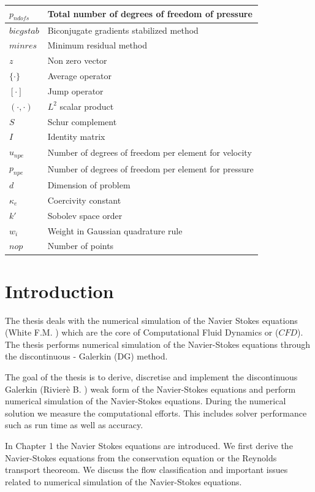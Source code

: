 \documentclass[a4paper,twoside,openright]{book}
\begin{document}
\begin{longtable}{| p{} | p{} |}
$p_{ndofs}$ & Total number of degrees of freedom of pressure\\
\hline
$bicgstab$ & Biconjugate gradients stabilized method\\
\hline
$minres$ & Minimum residual method\\
\hline
$z$ & Non zero vector\\
\hline
$\lbrace \cdot \rbrace$ & Average operator\\
\hline
$[\cdot]$ & Jump operator\\
\hline
$(\cdot,\cdot)$ & $L^2$ scalar product\\
\hline
$S$ & Schur complement\\
\hline
$I$ & Identity matrix\\
\hline
$u_{npe}$ & Number of degrees of freedom per element for velocity\\
\hline
$p_{npe}$ & Number of degrees of freedom per element for pressure\\
\hline
$d$ & Dimension of problem\\
\hline
$\kappa_e$ & Coercivity constant\\
\hline
$k'$ & Sobolev space order\\
\hline
$w_i$ & Weight in Gaussian quadrature rule\\
\hline
$nop$ & Number of points\\
\hline
\end{longtable}
\listoffigures
\listoftables

\tableofcontents

\chapter*{Introduction}

The thesis deals with the numerical simulation of the Navier Stokes equations (White F.M. \cite{white}) which are the core of Computational Fluid Dynamics or ($CFD$). The thesis performs numerical simulation of the Navier-Stokes equations through the discontinuous - Galerkin (DG) method.

The goal of the thesis is to derive, discretise and implement the discontinuous Galerkin (Rivier\`e B. \cite{riviere}) weak form of the Navier-Stokes equations and perform numerical simulation of the Navier-Stokes equations. During the numerical solution we measure the computational efforts. This includes solver performance such as run time as well as accuracy.

In Chapter 1 the Navier Stokes equations are introduced. We first derive the Navier-Stokes equations from the conservation equation or the Reynolds transport theoreom. We discuss the flow classification and important issues related to numerical simulation of the Navier-Stokes equations. 
\end{document}
